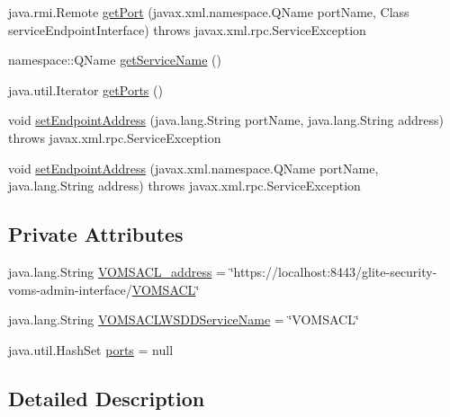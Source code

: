 \begin{DoxyCompactItemize}
\item 
java.rmi.Remote \hyperlink{classorg_1_1glite_1_1security_1_1voms_1_1service_1_1acl_1_1VOMSACLServiceLocator_ae91616a0bd39d0a38a333ad71760e09d}{getPort} (javax.xml.namespace.QName portName, Class serviceEndpointInterface)  throws javax.xml.rpc.ServiceException 
\item 
namespace::QName \hyperlink{classorg_1_1glite_1_1security_1_1voms_1_1service_1_1acl_1_1VOMSACLServiceLocator_a22f71848f68f08b34220ee9c3441e0d7}{getServiceName} ()
\item 
java.util.Iterator \hyperlink{classorg_1_1glite_1_1security_1_1voms_1_1service_1_1acl_1_1VOMSACLServiceLocator_aa5d4a5eb873320863445a1c48d477d8b}{getPorts} ()
\item 
void \hyperlink{classorg_1_1glite_1_1security_1_1voms_1_1service_1_1acl_1_1VOMSACLServiceLocator_afbed7e9142c1bb7873a74169aa8e0b72}{setEndpointAddress} (java.lang.String portName, java.lang.String address)  throws javax.xml.rpc.ServiceException 
\item 
void \hyperlink{classorg_1_1glite_1_1security_1_1voms_1_1service_1_1acl_1_1VOMSACLServiceLocator_a95d4c26b58e9378bb988e1c94c7bf79a}{setEndpointAddress} (javax.xml.namespace.QName portName, java.lang.String address)  throws javax.xml.rpc.ServiceException 
\end{DoxyCompactItemize}
\subsection*{Private Attributes}
\begin{DoxyCompactItemize}
\item 
java.lang.String \hyperlink{classorg_1_1glite_1_1security_1_1voms_1_1service_1_1acl_1_1VOMSACLServiceLocator_a9f9c7747368d8ca7660a6e8344e992a6}{VOMSACL\_\-address} = \char`\"{}https://localhost:8443/glite-\/security-\/voms-\/admin-\/interface/\hyperlink{interfaceorg_1_1glite_1_1security_1_1voms_1_1service_1_1acl_1_1VOMSACL}{VOMSACL}\char`\"{}
\item 
java.lang.String \hyperlink{classorg_1_1glite_1_1security_1_1voms_1_1service_1_1acl_1_1VOMSACLServiceLocator_a6ebe08020aea57b83fa59d577a8a32fd}{VOMSACLWSDDServiceName} = \char`\"{}VOMSACL\char`\"{}
\item 
java.util.HashSet \hyperlink{classorg_1_1glite_1_1security_1_1voms_1_1service_1_1acl_1_1VOMSACLServiceLocator_ac36bebd7d5a6317b41068128e9b8686d}{ports} = null
\end{DoxyCompactItemize}


\subsection{Detailed Description}


